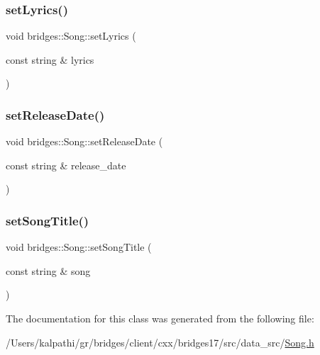 \mbox{\label{classbridges_1_1_song_af32f02057c6dd253ea4e8d002e548cf2}} 
\subsubsection{\texorpdfstring{set\+Lyrics()}{setLyrics()}}
{\footnotesize\ttfamily void bridges\+::\+Song\+::set\+Lyrics (\begin{DoxyParamCaption}\item[{const string \&}]{lyrics }\end{DoxyParamCaption})\hspace{0.3cm}{\ttfamily [inline]}}

\mbox{\label{classbridges_1_1_song_a492a14035331c66652488c4f222aa7b3}} 
\subsubsection{\texorpdfstring{set\+Release\+Date()}{setReleaseDate()}}
{\footnotesize\ttfamily void bridges\+::\+Song\+::set\+Release\+Date (\begin{DoxyParamCaption}\item[{const string \&}]{release\+\_\+date }\end{DoxyParamCaption})\hspace{0.3cm}{\ttfamily [inline]}}

\mbox{\label{classbridges_1_1_song_a18e3a6bd5f424a6dadf529bed446a0d0}} 
\subsubsection{\texorpdfstring{set\+Song\+Title()}{setSongTitle()}}
{\footnotesize\ttfamily void bridges\+::\+Song\+::set\+Song\+Title (\begin{DoxyParamCaption}\item[{const string \&}]{song }\end{DoxyParamCaption})\hspace{0.3cm}{\ttfamily [inline]}}



The documentation for this class was generated from the following file\+:\begin{DoxyCompactItemize}
\item 
/\+Users/kalpathi/gr/bridges/client/cxx/bridges17/src/data\+\_\+src/\mbox{\hyperlink{_song_8h}{Song.\+h}}\end{DoxyCompactItemize}
